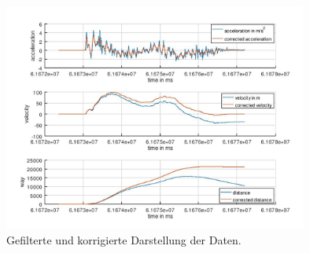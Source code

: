 \documentclass[12pt]{article}
\begin{document}
\begin{figure}[H]
	\centering
	\includegraphics[width=10cm]{images/filteredData.jpg}
	\caption{Gefilterte und korrigierte Darstellung der Daten.}
	\label{fig:filteredData}
\end{figure}


\newpage

\end{document}
